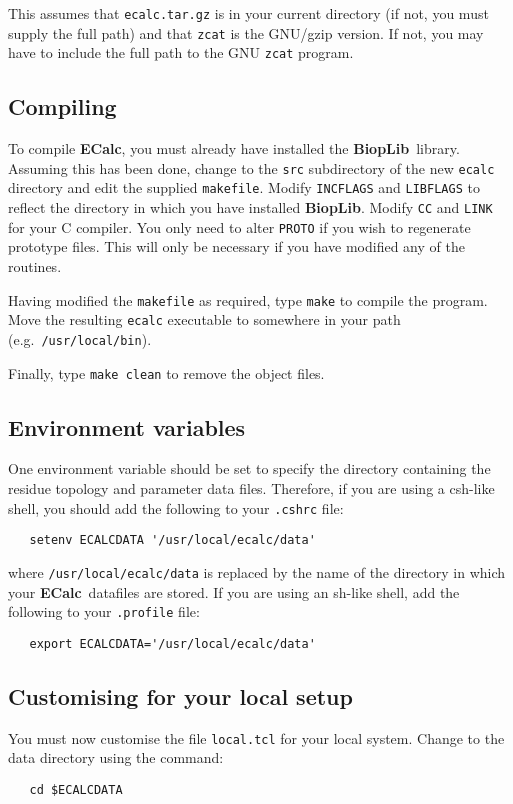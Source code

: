 \documentclass[12pt]{article}
\newcommand{\ecalc}{\mbox{\bf ECalc}}
\newcommand{\bioplib}{\mbox{\bf BiopLib}}
\begin{document}
This assumes that {\tt ecalc.tar.gz} is in your current directory (if not,
you must supply the full path) and that {\tt zcat} is the GNU/gzip 
version. If not, you may have to include the full path to the GNU 
{\tt zcat} program.



\subsection{Compiling}
To compile \ecalc, you must already have installed the \bioplib\
library. Assuming this has been done, change to the {\tt src}
subdirectory of the new {\tt ecalc} directory and edit the supplied
{\tt makefile}. Modify {\tt INCFLAGS} and {\tt LIBFLAGS} to reflect
the directory in which you have installed \bioplib. Modify {\tt CC}
and {\tt LINK} for your C compiler. You only need to alter {\tt PROTO}
if you wish to regenerate prototype files. This will only be necessary
if you have modified any of the routines.

Having modified the {\tt makefile} as required, type {\tt make} to
compile the program. Move the resulting {\tt ecalc} executable to
somewhere in your path (e.g.\ {\tt /usr/local/bin}).

Finally, type {\tt make clean} to remove the object files.



\subsection{Environment variables}
One environment variable should be set to specify the directory
containing the residue topology and parameter data files. Therefore,
if you are using a csh-like shell, you should add the following to
your {\tt .cshrc} file:
\begin{verbatim}
   setenv ECALCDATA '/usr/local/ecalc/data'
\end{verbatim}
where {\tt /usr/local/ecalc/data} is replaced by the name of the
directory in which your \ecalc\ datafiles are stored. If you are using
an sh-like shell, add the following to your {\tt .profile} file:
\begin{verbatim}
   export ECALCDATA='/usr/local/ecalc/data'
\end{verbatim}



\subsection{Customising for your local setup}
You must now customise the file {\tt local.tcl} for your local system.
Change to the data directory using the command:
\begin{verbatim}
   cd $ECALCDATA
\end{verbatim}
\end{document}
